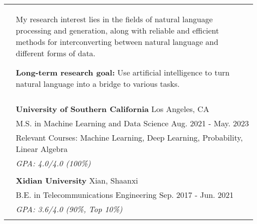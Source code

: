 \documentclass[letterpaper, 10pt]{article}
\begin{document}
\begin{longtable}{p{1.3in}p{4.8in}}



\nohyphens{\color{black}{Research Interests}}
& My research interest lies in the fields of natural language processing and generation, along with reliable and efficient methods for interconverting between natural language and different forms of data. 

\textbf{Long-term research goal:} Use artificial intelligence to turn natural language into a bridge to various tasks. \\

\\




\color{black}{Education} & \textbf{University of Southern California} \hfill Los Angeles, CA \\
& M.S. in Machine Learning and Data Science \hfill Aug. 2021 - May. 2023\\
& Relevant Courses: Machine Learning, Deep Learning, Probability, Linear Algebra \\
& {\it GPA: 4.0/4.0 (100\%)}\\
& \\

& \textbf{Xidian University} \hfill Xian, Shaanxi\\
& B.E. in Telecommunications Engineering \hfill Sep. 2017 - Jun. 2021 \\
& {\it GPA: 3.6/4.0 (90\%, Top 10\%)}\\
& \\



\end{longtable}
\end{document}
